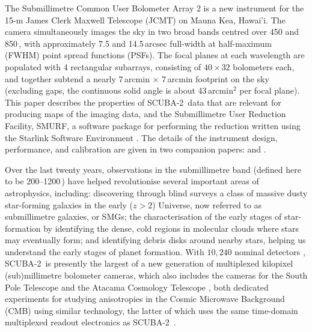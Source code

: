 \documentclass[useAMS,usenatbib,nofootinbib]{mn2e}
\newcommand{\scuba}{SCUBA-2}
\begin{document}
The Submillimetre Common User Bolometer Array 2
\citep[\scuba,][]{holland2012} is a new instrument for the 15-m James
Clerk Maxwell Telescope (JCMT) on Mauna Kea, Hawai'i. The camera
simultaneously images the sky in two broad bands centred over 450 and
850\,\micron, with approximately 7.5 and 14.5\,arcsec full-width at
half-maximum (FWHM) point spread functions (PSFs). The focal planes at
each wavelength are populated with 4 rectangular subarrays, consisting
of $40 \times 32$ bolometers each, and together subtend a nearly
7\,arcmin $\times$ 7\,arcmin footprint on the sky (excluding gaps, the
continuous solid angle is about 43\,arcmin$^{2}$ per focal plane).
This paper describes the properties of \scuba\ data that are relevant
for producing maps of the imaging data, and the Submillimetre User
Reduction Facility, SMURF, a software package for performing the
reduction written using the Starlink Software Environment
\citep{1993ASPC...52..229W,2009ASPC..411..418J}. The details of the
instrument design, performance, and calibration are given in two
companion papers: \citet{holland2012} and \citet{dempsey2012}.

Over the last twenty years, observations in the submillimetre band
(defined here to be 200--1200\,\micron) have helped revolutionise
several important areas of astrophysics, including: discovering
through blind surveys a class of massive dusty star-forming galaxies
in the early ($z>2$) Universe, now referred to as submillimetre
galaxies, or SMGs; the characterisation of the early stages of
star-formation by identifying the dense, cold regions in molecular
clouds where stars may eventually form; and identifying debris disks
around nearby stars, helping us understand the early stages of planet
formation.  With $10,240$ nominal detectors \citep[of which $\sim$69\%
work and are typically useful,][]{holland2012}, \scuba\ is presently
the largest of a new generation of multiplexed kilopixel
(sub)millimetre bolometer cameras, which also includes the cameras for
the South Pole Telescope \citep[SPT,][]{carlstrom2011} and the Atacama
Cosmology Telescope \citep[ACT,][]{swetz2011}, both dedicated
experiments for studying anisotropies in the Cosmic Microwave
Background (CMB) using similar technology, the latter of which uses the
same time-domain multiplexed readout electronics as \scuba\
\citep{battistelli2008}.
\end{document}
